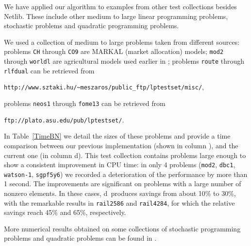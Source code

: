 We have applied our algorithm to examples from other test collections 
besides Netlib.
These include other medium to large linear programming problems, 
stochastic problems and quadratic programming problems.

We used a collection of medium to large problems taken from different
sources: problems {\tt CH} through {\tt CO9}
are MARKAL (market allocation) models; {\tt mod2} through {\tt worldl} are
agricultural models used earlier in \cite{Gondzio96}; problems {\tt route}
through {\tt rlfdual} can be retrieved from 
\begin{center}
{\tt http://www.sztaki.hu/\~{}meszaros/public\_ftp/lptestset/misc/},
\end{center}
problems {\tt neos1} through {\tt fome13} can be retrieved from 
\begin{center}
{\tt ftp://plato.asu.edu/pub/lptestset/}.
\end{center}

In Table~\ref{TimeBN} we detail the sizes of these problems and provide 
a time comparison between our previous implementation (shown in column
\HO), and the current one (in column d\HO).
This test collection contains problems large enough 
to show a consistent improvement in CPU time: in only 4 problems 
({\tt mod2}, {\tt dbc1}, {\tt watson-1}, {\tt sgpf5y6}) 
we recorded a deterioration of the performance by more than 1 second.
The improvements are significant on problems with a large 
number of nonzero elements. In these cases, d\HO\
produces savings from about 10\% to 30\%, with the remarkable results
in {\tt rail2586} and {\tt rail4284}, for which the relative savings 
reach 45\% and 65\%, respectively.

More numerical results obtained on some collections of stochastic
programming problems and quadratic problems can be found in
\cite{ColomboGondzio05}.

